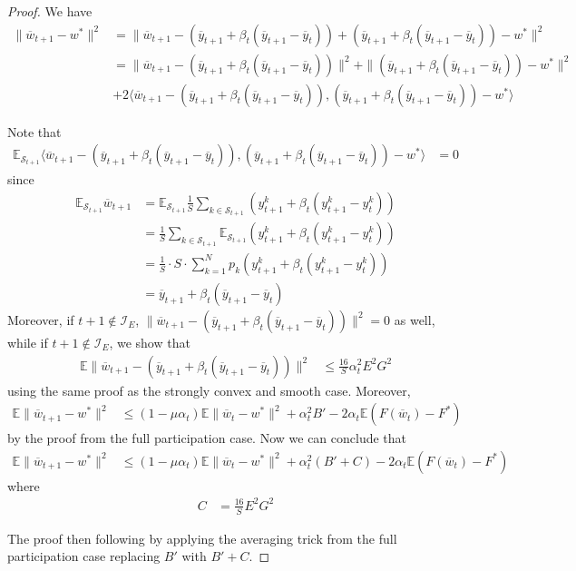 %
\begin{proof}
	We have
	\begin{align*}
	\|\overline{w}_{t+1}-w^{\ast}\|^{2} & =\|\overline{w}_{t+1}-(\overline{y}_{t+1}+\beta_{t}(\overline{y}_{t+1}-\overline{y}_{t}))+(\overline{y}_{t+1}+\beta_{t}(\overline{y}_{t+1}-\overline{y}_{t}))-w^{\ast}\|^{2}\\
	& =\|\overline{w}_{t+1}-(\overline{y}_{t+1}+\beta_{t}(\overline{y}_{t+1}-\overline{y}_{t}))\|^{2}+\|(\overline{y}_{t+1}+\beta_{t}(\overline{y}_{t+1}-\overline{y}_{t}))-w^{\ast}\|^{2}\\
	& +2\langle\overline{w}_{t+1}-(\overline{y}_{t+1}+\beta_{t}(\overline{y}_{t+1}-\overline{y}_{t})),(\overline{y}_{t+1}+\beta_{t}(\overline{y}_{t+1}-\overline{y}_{t}))-w^{\ast}\rangle
	\end{align*}
	
	Note that 
	\begin{align*}
	\mathbb{E}_{\mathcal{S}_{t+1}}\langle\overline{w}_{t+1}-(\overline{y}_{t+1}+\beta_{t}(\overline{y}_{t+1}-\overline{y}_{t})),(\overline{y}_{t+1}+\beta_{t}(\overline{y}_{t+1}-\overline{y}_{t}))-w^{\ast}\rangle & =0
	\end{align*}
	since 
	\begin{align*}
	\mathbb{E}_{\mathcal{S}_{t+1}}\overline{w}_{t+1} & =\mathbb{E}_{\mathcal{S}_{t+1}}\frac{1}{S}\sum_{k\in\mathcal{S}_{t+1}}(y_{t+1}^{k}+\beta_{t}(y_{t+1}^{k}-y_{t}^{k}))\\
	& =\frac{1}{S}\sum_{k\in\mathcal{S}_{t+1}}\mathbb{E}_{\mathcal{S}_{t+1}}(y_{t+1}^{k}+\beta_{t}(y_{t+1}^{k}-y_{t}^{k}))\\
	& =\frac{1}{S}\cdot S\cdot\sum_{k=1}^{N}p_{k}(y_{t+1}^{k}+\beta_{t}(y_{t+1}^{k}-y_{t}^{k}))\\
	& =\overline{y}_{t+1}+\beta_{t}(\overline{y}_{t+1}-\overline{y}_{t})
	\end{align*}
	Moreover, if $t+1\notin\mathcal{I}_{E}$, $\|\overline{w}_{t+1}-(\overline{y}_{t+1}+\beta_{t}(\overline{y}_{t+1}-\overline{y}_{t}))\|^{2}=0$
	as well, while if $t+1\notin\mathcal{I}_{E}$, we show that 
	\begin{align*}
	\mathbb{E}\|\overline{w}_{t+1}-(\overline{y}_{t+1}+\beta_{t}(\overline{y}_{t+1}-\overline{y}_{t}))\|^{2} & \leq\frac{16}{S}\alpha_{t}^{2}E^{2}G^{2}
	\end{align*}
	using the same proof as the strongly convex and smooth case. Moreover,
	\begin{align*}
	\mathbb{E}\|\overline{w}_{t+1}-w^{\ast}\|^{2} & \leq(1-\mu\alpha_{t})\mathbb{E}\|\overline{w}_{t}-w^{\ast}\|^{2}+\alpha_{t}^{2}B'-2\alpha_{t}\mathbb{E}(F(\overline{w}_{t})-F^{\ast})
	\end{align*}
	by the proof from the full participation case. Now we can conclude
	that 
	\begin{align*}
	\mathbb{E}\|\overline{w}_{t+1}-w^{\ast}\|^{2} & \leq(1-\mu\alpha_{t})\mathbb{E}\|\overline{w}_{t}-w^{\ast}\|^{2}+\alpha_{t}^{2}(B'+C)-2\alpha_{t}\mathbb{E}(F(\overline{w}_{t})-F^{\ast})
	\end{align*}
	where 
	\begin{align*}
	C & =\frac{16}{S}E^{2}G^{2}
	\end{align*}
	
	The proof then following by applying the averaging trick from the
	full participation case replacing $B'$ with $B'+C$.
\end{proof}